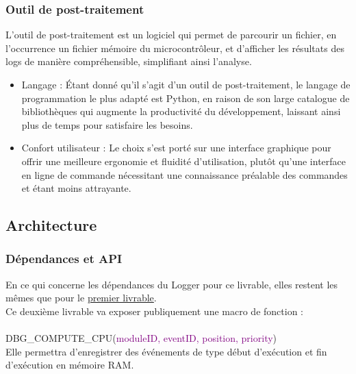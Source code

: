 \documentclass[a4paper, 12pt]{report}
\begin{document}
\subsubsection{Outil de post-traitement}
L'outil de post-traitement est un logiciel qui permet de parcourir un fichier, en l'occurrence un fichier mémoire du microcontrôleur, et d'afficher les résultats des logs de manière compréhensible, simplifiant ainsi l'analyse.

\begin{itemize}
\item Langage : Étant donné qu'il s'agit d'un outil de post-traitement, le langage de programmation le plus adapté est Python, en raison de son large catalogue de bibliothèques qui augmente la productivité du développement, laissant ainsi plus de temps pour satisfaire les besoins.

\item Confort utilisateur : Le choix s'est porté sur une interface graphique pour offrir une meilleure ergonomie et fluidité d'utilisation, plutôt qu'une interface en ligne de commande nécessitant une connaissance préalable des commandes et étant moins attrayante.

\end{itemize}
\subsection{Architecture}

\subsubsection{Dépendances et API}
En ce qui concerne les dépendances du Logger pour ce livrable, elles restent les mêmes que pour le \hyperref[fig:depdenL1]{premier livrable}.
\\
       
    Ce deuxième livrable va exposer publiquement une macro de fonction :\\
    \\
    {\color{green}DBG\_COMPUTE\_CPU}(\textcolor{purple}{moduleID, eventID, position, priority})
    \\

    Elle permettra d'enregistrer des événements de type début d'exécution et fin d'exécution en mémoire RAM.\\
\end{document}
